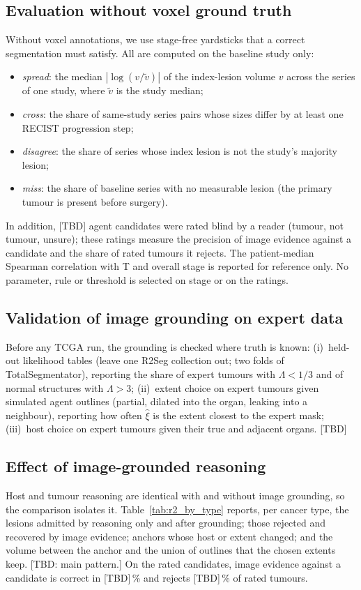 \documentclass[fleqn,10pt]{olplainarticle}
\begin{document}
\subsection{Evaluation without voxel ground truth}
\label{sec:eval_protocol}
Without voxel annotations, we use stage-free yardsticks that a correct segmentation must satisfy. All are computed on
the baseline study only:
\begin{itemize}
  \item \emph{spread}: the median $|\log(v/\tilde v)|$ of the index-lesion volume $v$ across the series of one study,
  where $\tilde v$ is the study median;
  \item \emph{cross}: the share of same-study series pairs whose sizes differ by at least one RECIST progression step;
  \item \emph{disagree}: the share of series whose index lesion is not the study's majority lesion;
  \item \emph{miss}: the share of baseline series with no measurable lesion (the primary tumour is present before
  surgery).
\end{itemize}
In addition, [TBD] agent candidates were rated blind by a reader (tumour, not tumour, unsure); these ratings measure the
precision of image evidence against a candidate and the share of rated tumours it rejects. The patient-median Spearman
correlation with T and overall stage is reported for reference only. No parameter, rule or threshold is selected on stage
or on the ratings.

\subsection{Validation of image grounding on expert data}
\label{sec:results_expert}
Before any TCGA run, the grounding is checked where truth is known: (i)~held-out likelihood tables (leave one R2Seg
collection out; two folds of TotalSegmentator), reporting the share of expert tumours with $\Lambda<1/3$ and of normal
structures with $\Lambda>3$; (ii)~extent choice on expert tumours given simulated agent outlines (partial, dilated into the
organ, leaking into a neighbour), reporting how often $\hat\xi$ is the extent closest to the expert mask; (iii)~host choice on
expert tumours given their true and adjacent organs. [TBD]

\subsection{Effect of image-grounded reasoning}
\label{sec:results_r2}
Host and tumour reasoning are identical with and without image grounding, so the comparison isolates it.
Table~\ref{tab:r2_by_type} reports, per cancer type, the lesions admitted by reasoning only and after grounding; those
rejected and recovered by image evidence; anchors whose host or extent changed; and the volume between the anchor and the
union of outlines that the chosen extents keep. [TBD: main pattern.] On the rated candidates, image evidence against a
candidate is correct in [TBD]\,\% and rejects [TBD]\,\% of rated tumours.
\end{document}
